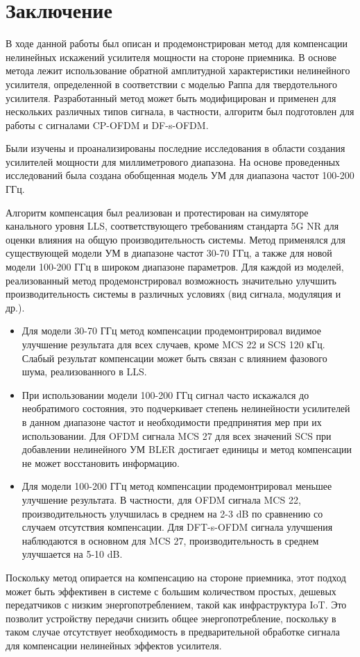 \section{Заключение}

В ходе данной работы был описан и продемонстрирован метод для компенсации
нелинейных искажений усилителя мощности на стороне приемника. В основе
метода лежит использование обратной амплитудной характеристики нелинейного
усилителя, определенной в соответствии с моделью Раппа для твердотельного
усилителя. Разработанный метод может быть модифицирован и применен для
нескольких различных типов сигнала, в частности, алгоритм был подготовлен
для работы с сигналами CP-OFDM и DF-s-OFDM.

Были изучены и проанализированы последние исследования в области создания
усилителей мощности для миллиметрового диапазона. На основе проведенных
исследований была создана обобщенная модель УМ для диапазона частот 100-200
ГГц.

Алгоритм компенсация был реализован и протестирован на симуляторе
канального уровня LLS, соответствующего требованиям стандарта 5G NR для
оценки влияния на общую производительность системы. Метод применялся для
существующей модели УМ в диапазоне частот 30-70 ГГц, а также для новой
модели 100-200 ГГц в широком диапазоне параметров. Для каждой из моделей,
реализованный метод продемонстрировал возможность значительно улучшить
производительность системы в различных условиях (вид сигнала, модуляция и
др.).
\begin{itemize}
    \item Для модели 30-70 ГГц метод компенсации продемонтрировал видимое
    улучшение результата для всех случаев, кроме MCS 22 и SCS 120 кГц. Слабый
    результат компенсации может быть связан с влиянием фазового шума,
    реализованного в LLS.
    \item При использовании модели 100-200 ГГц сигнал часто искажался до
    необратимого состояния, это подчеркивает степень нелинейности
    усилителей в данном диапазоне частот и необходимости предпринятия мер
    при их использовании. Для OFDM сигнала MCS 27 для всех значений SCS при
    добавлении нелинейного УМ BLER достигает единицы и метод компенсации не
    может восстановить информацию.
    \item Для модели 100-200 ГГц метод компенсации продемонтрировал меньшее
    улучшение результата. В частности, для OFDM сигнала MCS 22, производительность
    улучшилась в среднем на 2-3 dB по сравнению со случаем отсутствия
    компенсации. Для DFT-s-OFDM сигнала улучшения наблюдаются в основном для
    MCS 27, производительность в среднем улучшается на 5-10 dB.
\end{itemize}

Поскольку метод опирается на компенсацию на стороне приемника, этот
подход может быть эффективен в системе с большим количеством простых,
дешевых передатчиков с низким энергопотреблением, такой как инфраструктура
IoT. Это позволит устройству передачи снизить общее энергопотребление,
поскольку в таком случае отсутствует необходимость в предварительной
обработке сигнала для компенсации нелинейных эффектов усилителя.